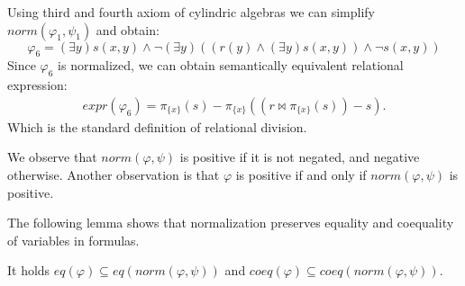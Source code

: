 \documentclass{lmcs}
\def\norm{norm}
\def\expr{expr}
\def\eq{eq}
\def\coeq{coeq}
\begin{document}
Using third and fourth axiom of cylindric algebras we can simplify $\norm(\varphi_1,\psi_1)$ and obtain:
$$\varphi_6=(\exists y)s(x,y)\wedge\neg(\exists y)((r(y)\wedge(\exists y)s(x,y))\wedge\neg s(x,y))$$
Since $\varphi_6$ is normalized, we can obtain semantically equivalent relational expression:
\begin{align*}
\expr(\varphi_6)=\pi_{\{x\}}(s)-\pi_{\{x\}}((r\bowtie\pi_{\{x\}}(s))-s).
\end{align*}
Which is the standard definition of relational division.



We observe that $\norm(\varphi,\psi)$ is positive if it is not negated, and negative otherwise. Another observation is that $\varphi$ is positive if and only if $\norm(\varphi, \psi)$ is positive.

The following lemma shows that normalization preserves equality and coequality of variables in formulas.
\begin{lem}\label{lem:eq_coeq_norm}
It holds $\eq(\varphi)\subseteq\eq(\norm(\varphi,\psi))$ and $\coeq(\varphi)\subseteq\coeq(\norm(\varphi,\psi))$.  
\end{lem}
\end{document}
